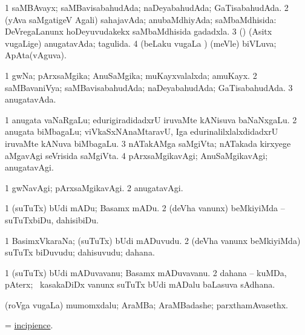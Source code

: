 \bentry
{}
\gl{\gu}
\bmng
\bnum
\num{1} saMBAvayx; saMBavisabahudAda; naDeyabahudAda; GaTisabahudAda. 
\num{2} (yAva saMgatigeV Agali) sahajavAda; anubaMdhiyAda; saMbaMdhisida:  DeVregaLanunx hoDeyuvudakekx saMbaMdhisida gadadxla. 
\num{3} (\nAyxshA) (Asitx \mo vugaLige) anugatavAda; tagulida. 
\num{4} (beLaku \mo vugaLa \vi) (meVle) biVLuva; ApAta(vAguva). 
\enum
\emng
\eentry

\bentry
{}
\gl{\gu}
\bmng
\bnum
\num{1} gwNa; pArxsaMgika; AnuSaMgika; muKayxvalalxda; amuKayx. 
\num{2} saMBavaniVya; saMBavisabahudAda; naDeyabahudAda; GaTisabahudAda. 
\num{3} anugatavAda. 
\enum
\emng

\noindent
\gl{\pagu}
\bmng
\bnum
\num{1}  anugata vaNaRgaLu; edurigiradidadxrU iruvaMte kANisuva baNaNxgaLu. 
\num{2}  anugata biMbagaLu; viVkaSxNAnaMtaravU, Iga edurinalilxlalxdidadxrU iruvaMte kANuva biMbagaLu. 
\num{3}  nATakAMga saMgiVta; nATakada kirxyege aMgavAgi seVrisida saMgiVta. 
\num{4}  pArxsaMgikavAgi; AnuSaMgikavAgi; anugatavAgi. 
\enum
\emng
\eentry

\bentry
{}
\gl{\kirxvi}
\bmng
\bnum
\num{1} gwNavAgi; pArxsaMgikavAgi. 
\num{2} anugatavAgi. 
\enum
\emng
\eentry

\bentry
{}
\gl{\sakirx}
\bmng
\bnum
\num{1} (suTuTx) bUdi mADu; Basamx mADu. 
\num{2} (deVha \mo vanunx) beMkiyiMda -- suTuTxbiDu, dahisibiDu. 
\enum
\emng
\eentry

\bentry
{}
\gl{\nA}
\bmng
\bnum
\num{1} BasimxVkaraNa; (suTuTx) bUdi mADuvudu. 
\num{2} (deVha \mo vanunx beMkiyiMda) suTuTx biDuvudu; dahisuvudu; dahana. 
\enum
\emng
\eentry

\bentry
{}
\gl{\nA}
\bmng
\bnum
\num{1} (suTuTx) bUdi mADuvavanu; Basamx mADuvavanu. 
\num{2} dahana -- kuMDa, pAterx; \kanmu\ kasakaDiDx \mo vanunx suTuTx bUdi mADalu baLasuva sAdhana. 
\enum
\emng
\eentry

\bentry
{}
\gl{\nA}
\bmng
(roVga \mo vugaLa) mumomxdalu; AraMBa; AraMBadashe; parxthamAvasethx. 
\emng
\eentry

\bentry
{}
\gl{\nA}
\bmng
 = \hyperlink{incipience}{incipience}. 
\emng
\eentry


